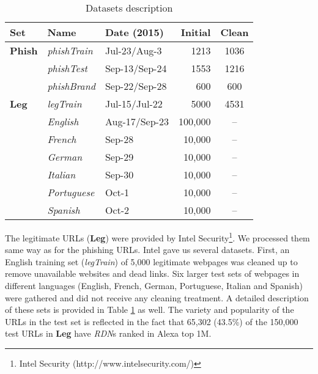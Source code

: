 \documentclass[10pt,conference,compsocconf,letterpaper]{IEEEtran}
\begin{document}
\begin{table}[tbh]
\caption{Datasets description} \centering
\begin{tabular}{l l l r c}

\textbf{Set} & \textbf{Name} & \textbf{Date (2015)} & \textbf{Initial} & \textbf{Clean}\\ \hline
\textbf{Phish} & \textit{phishTrain} & Jul-23/Aug-3 & 1213 & 1036 \\
& \textit{phishTest} & Sep-13/Sep-24 & 1553 & 1216 \\
& \textit{phishBrand} & Sep-22/Sep-28 & 600 & 600 \\ \hline
\textbf{Leg} & \textit{legTrain} & Jul-15/Jul-22 & 5000 & 4531\\ 
& \textit{English} & Aug-17/Sep-23 & 100,000 & -- \\
& \textit{French} & Sep-28 & 10,000 & -- \\
& \textit{German} & Sep-29 & 10,000 & -- \\
& \textit{Italian} & Sep-30 & 10,000 & -- \\
& \textit{Portuguese} & Oct-1 & 10,000 & -- \\
& \textit{Spanish} & Oct-2 & 10,000 & -- \\

\end{tabular}
\label{tab:dataset}
\end{table}

The legitimate URLs (\textbf{Leg}) were provided by Intel Security\footnote{Intel Security (http://www.intelsecurity.com/)}. We processed them same way as for the phishing URLs.
Intel gave us several datasets. First, an English training set
(\textit{legTrain}) of 5,000 legitimate webpages was cleaned up to remove unavailable websites and dead links. Six larger test sets of webpages in different languages (English, French, German, Portuguese, Italian and Spanish) were gathered and did not receive any cleaning treatment. A detailed description of these sets is provided in Table \ref{tab:dataset} as well.
The variety and popularity of the URLs in the test set is reflected in the fact that 65,302 (43.5\%) of the 150,000 test URLs in \textbf{Leg} have \textit{RDN}s ranked in Alexa top 1M.
\end{document}
